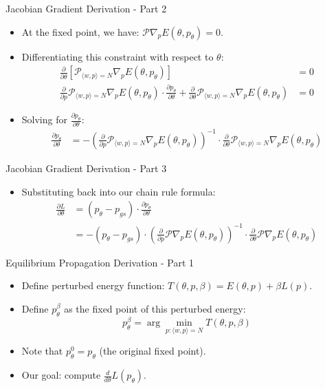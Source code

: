 \documentclass{beamer}
\begin{document}
\begin{frame}{Jacobian Gradient Derivation - Part 2}
  \begin{itemize}
    \item At the fixed point, we have: $\mathcal{P}\nabla_p E(\theta, p_{\theta}) = 0$.
    \item Differentiating this constraint with respect to $\theta$:
    \begin{align}
      \frac{\partial}{\partial \theta}\left[\mathcal{P}_{\langle w,p \rangle = N}\nabla_p E(\theta, p_{\theta})\right] &= 0 \\
      \frac{\partial}{\partial p}\mathcal{P}_{\langle w,p \rangle = N}\nabla_p E(\theta, p_{\theta}) \cdot \frac{\partial p_{\theta}}{\partial \theta} + \frac{\partial}{\partial \theta}\mathcal{P}_{\langle w,p \rangle = N}\nabla_p E(\theta, p_{\theta}) &= 0
    \end{align}
    \item Solving for $\frac{\partial p_{\theta}}{\partial \theta}$:
    \begin{align}
      \frac{\partial p_{\theta}}{\partial \theta} &= -\left(\frac{\partial}{\partial p}\mathcal{P}_{\langle w,p \rangle = N}\nabla_p E(\theta, p_{\theta})\right)^{-1} \cdot \frac{\partial}{\partial \theta}\mathcal{P}_{\langle w,p \rangle = N}\nabla_p E(\theta, p_{\theta})
    \end{align}
  \end{itemize}
\end{frame}

\begin{frame}{Jacobian Gradient Derivation - Part 3}
  \begin{itemize}
    \item Substituting back into our chain rule formula:
    \begin{align}
      \frac{\partial L}{\partial \theta} &= (p_{\theta} - p_{gs}) \cdot \frac{\partial p_{\theta}}{\partial \theta} \\
      &= -(p_{\theta} - p_{gs}) \cdot \left(\frac{\partial}{\partial p}\mathcal{P}\nabla_p E(\theta, p_{\theta})\right)^{-1} \cdot \frac{\partial}{\partial \theta}\mathcal{P}\nabla_p E(\theta, p_{\theta})
    \end{align}

  \end{itemize}
\end{frame}

\begin{frame}{Equilibrium Propagation Derivation - Part 1}
  \begin{itemize}
    \item Define perturbed energy function: $T(\theta,p,\beta)=E(\theta,p)+\beta L(p)$.
    \item Define $p_{\theta}^{\beta}$ as the fixed point of this perturbed energy:
    \[
      p_{\theta}^{\beta} = \arg\min_{p:\langle w,p \rangle = N} T(\theta, p, \beta)
    \]
    \item Note that $p_{\theta}^{0} = p_{\theta}$ (the original fixed point).
    \item Our goal: compute $\frac{d}{d\theta}L(p_{\theta})$.
  \end{itemize}
\end{frame}
\end{document}

